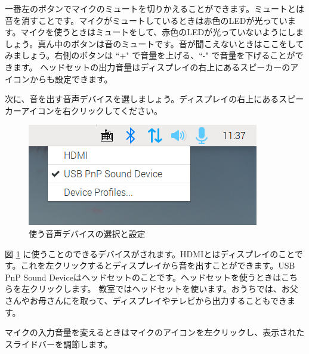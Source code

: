 一番左のボタンでマイクのミュートを切りかえることができます。ミュートとは音を消すことです。マイクがミュートしているときは赤色のLEDが光っています。マイクを使うときはミュートをして、赤色のLEDが光っていないようにしましょう。真ん中のボタンは音のミュートです。音が聞こえないときはここをしてみましょう。右側のボタンは ``+" で音量を上げる、``-" で音量を下げることができます。
ヘッドセットの出力音量はディスプレイの右上にあるスピーカーのアイコンからも設定できます。

次に、音を出す音声デバイスを選しましょう。ディスプレイの右上にあるスピーカーアイコンを右クリックしてください。

\begin{figure}[H]
\begin{center}
    \includegraphics[width=\linewidth]{images/select_sink.png}
    \caption{使う音声デバイスの選択と設定}
    \label{使う音声デバイスの選択と設定}
\end{center}
\end{figure}

図 \ref{使う音声デバイスの選択と設定} に使うことのできるデバイスがされます。HDMIとはディスプレイのことです。これを左クリックするとディスプレイから音を出すことができます。USB PnP Sound Deviceはヘッドセットのことです。ヘッドセットを使うときはこちらを左クリックします。
教室ではヘッドセットを使います。おうちでは、お父さんやお母さんにを取って、ディスプレイやテレビから出力することもできます。

マイクの入力音量を変えるときはマイクのアイコンを左クリックし、表示されたスライドバーを調節します。

